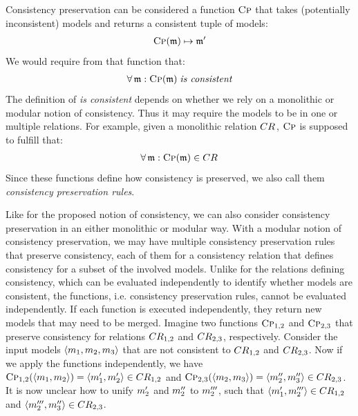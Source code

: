 Consistency preservation can be considered a function $\textsc{Cp}$ that takes (potentially inconsistent) models and returns a consistent tuple of models:
\begin{align*}
    \textsc{Cp}(\mathfrak{m}) \mapsto \mathfrak{m'}
\end{align*}
We would require from that function that: 
\begin{align*}
    \forall \modeltuple{m} : \function{Cp}(\modeltuple{m}) \mathtextspacebefore{is consistent}
\end{align*}
The definition of \emph{is consistent} depends on whether we rely on a monolithic or modular notion of consistency.
Thus it may require the models to be in one or multiple relations.
For example, given a monolithic relation $CR_{}$, $\textsc{Cp}$ is supposed to fulfill that: 
\begin{align*}
    \forall \modeltuple{m} : \function{Cp}(\modeltuple{m}) \in \consistencyrelation{CR}{}
\end{align*}
Since these functions define how consistency is preserved, we also call them \emph{consistency preservation rules}.

Like for the proposed notion of consistency, we can also consider consistency preservation in an either monolithic or modular way.
With a modular notion of consistency preservation, we may have multiple consistency preservation rules that preserve consistency, each of them for a consistency relation that defines consistency for a subset of the involved models.
Unlike for the relations defining consistency, which can be evaluated independently to identify whether models are consistent, the functions, i.e. consistency preservation rules, cannot be evaluated independently.
If each function is executed independently, they return new models that may need to be merged. 
Imagine two functions $\textsc{Cp}_{1,2}$ and $\textsc{Cp}_{2,3}$ that preserve consistency for relations $CR_{1,2}$ and $CR_{2,3}$, respectively.
Consider the input models $\langle m_{1}, m_{2}, m_{3} \rangle$ that are not consistent to $CR_{1,2}$ and $CR_{2,3}$.
Now if we apply the functions independently, we have $\textsc{Cp}_{1,2}(\langle m_{1}, m_{2} \rangle) = \langle m'_{1}, m'_{2} \rangle \in CR_{1,2}$ and 
$\textsc{Cp}_{2,3}(\langle m_{2}, m_{3} \rangle) = \langle m''_{2}, m''_{3} \rangle \in CR_{2,3}$.
It is now unclear how to unify $m'_{2}$ and $m''_{2}$ to $m'''_{2}$, such that $\langle m'_{1}, m'''_{2} \rangle \in CR_{1,2}$ and  $\langle m'''_{2}, m''_{3} \rangle \in CR_{2,3}$.

